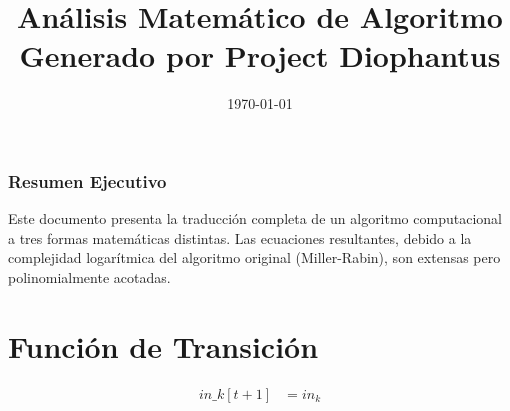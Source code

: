\documentclass[10pt, a4paper]{article}
\title{Análisis Matemático de Algoritmo \\ \large Generado por Project Diophantus}
\author{}
\date{\today}
\begin{document}
\maketitle
\section*{Resumen Ejecutivo}
Este documento presenta la traducción completa de un algoritmo computacional a tres formas matemáticas distintas.
Las ecuaciones resultantes, debido a la complejidad logarítmica del algoritmo original (Miller-Rabin), son extensas pero polinomialmente acotadas.
\part{Función de Transición}
\begin{align*}
in\_k[t+1] &= in_k \\

\end{align*}
\end{document}
